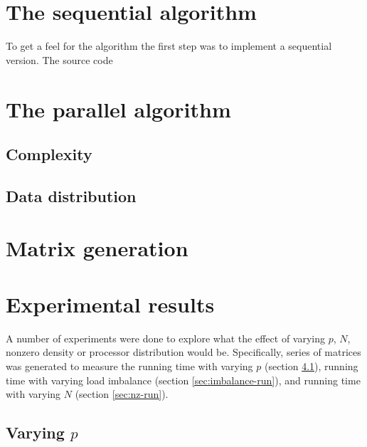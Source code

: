 \documentclass[a4paper]{article}
\begin{document}
\section{The sequential algorithm}

To get a feel for the algorithm the first step was to implement a sequential version. The source code 

\section{The parallel algorithm}

\subsection{Complexity}

\subsection{Data distribution}

\section{Matrix generation}


\section{Experimental results}

A number of experiments were done to explore what the effect of varying $p$,
$N$, nonzero density or processor distribution would be. Specifically, series
of matrices was generated to measure the running time with varying $p$ (section
\ref{sec:time-run}), running time with varying load imbalance (section
\ref{sec:imbalance-run}), and running time with varying $N$ (section
\ref{sec:nz-run}).

\subsection{Varying $p$}\label{sec:time-run}
\end{document}
